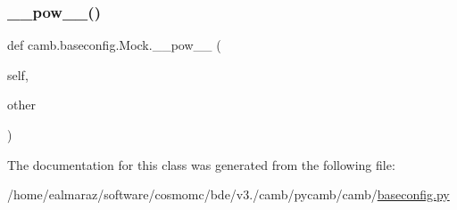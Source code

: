 \subsubsection{\texorpdfstring{\+\_\+\+\_\+pow\+\_\+\+\_\+()}{\_\_pow\_\_()}}
{\footnotesize\ttfamily def camb.\+baseconfig.\+Mock.\+\_\+\+\_\+pow\+\_\+\+\_\+ (\begin{DoxyParamCaption}\item[{}]{self,  }\item[{}]{other }\end{DoxyParamCaption})}



The documentation for this class was generated from the following file\+:\begin{DoxyCompactItemize}
\item 
/home/ealmaraz/software/cosmomc/bde/v3./camb/pycamb/camb/\mbox{\hyperlink{baseconfig_8py}{baseconfig.\+py}}\end{DoxyCompactItemize}
